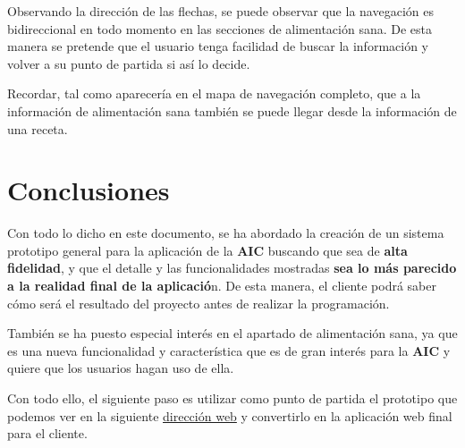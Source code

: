 \documentclass{\ClassPath/viu-tfm-template}
\begin{document}
Observando la dirección de las flechas, se puede observar que la navegación es bidireccional en todo momento en las secciones de alimentación sana. De esta manera se pretende que el usuario tenga facilidad de buscar la información y volver a su punto de partida si así lo decide.

Recordar, tal como aparecería en el mapa de navegación completo, que a la información de alimentación sana también se puede llegar desde la información de una receta.


\chapter{Conclusiones}

Con todo lo dicho en este documento, se ha abordado la creación de un sistema prototipo general para la aplicación de la \textbf{AIC} buscando que sea de \textbf{alta fidelidad}, y que el detalle y las funcionalidades mostradas \textbf{sea lo más parecido a la realidad final de la aplicació}n. De esta manera, el cliente podrá saber cómo será el resultado del proyecto antes de realizar la programación.

También se ha puesto especial interés en el apartado de alimentación sana, ya que es una nueva funcionalidad y característica que es de gran interés para la \textbf{AIC} y quiere que los usuarios hagan uso de ella.

Con todo ello, el siguiente paso es utilizar como punto de partida el prototipo que podemos ver en la siguiente \href{https://yuki.github.io/VIU_03MASW/preview.html}{dirección web} y convertirlo en la aplicación web final para el cliente.


\end{document}
